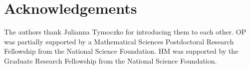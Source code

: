 \documentclass[12pt]{amsart}
\theoremstyle{definition}
\theoremstyle{remark}
\numberwithin{equation}{section}
\begin{document}
%

\section*{Acknowledgements}
The authors thank Julianna Tymoczko for introducing them to each other. OP was partially supported by a Mathematical Sciences Postdoctoral Research Fellowship from the National Science Foundation. HM was supported by the Graduate Research Fellowship from the National Science Foundation. 


%
%


 

\end{document}
